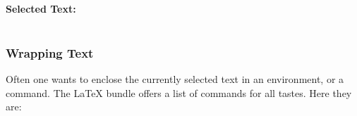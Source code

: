 \documentclass[11pt, x11names]{article}
\begin{document}
\inputminted[frame=lines]{tex}{TeX/Table_2_3.tex}


\paragraph{Selected Text: }

\inputminted[frame=lines]{tex}{TeX/Table_3_4_t.tex}


\subsubsection{Wrapping Text}

Often one wants to enclose the currently selected text in an environment, or a command. The LaTeX bundle offers a list of  commands for all tastes. Here they are:
\end{document}
